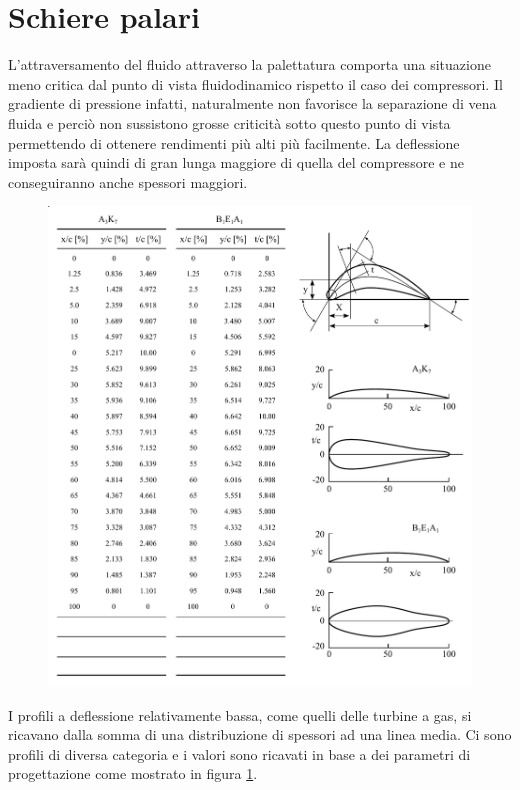 \section{Schiere palari}
L'attraversamento del fluido attraverso la palettatura comporta una situazione meno critica dal punto di vista fluidodinamico rispetto il caso dei compressori. Il gradiente di pressione infatti, naturalmente non favorisce la separazione di vena fluida e perciò non sussistono grosse criticità sotto questo punto di vista permettendo di ottenere rendimenti più alti più facilmente. La deflessione imposta sarà quindi di gran lunga maggiore di quella del compressore e ne conseguiranno anche spessori maggiori. 
\begin{figure}
\centering
  \includegraphics[width=\textwidth]{fig/SchierePaleTab.pdf}
\caption{}
\label{fig:SchierePaleTab}
\end{figure}

I profili a deflessione relativamente bassa, come quelli delle turbine a gas, si ricavano dalla somma di una distribuzione di spessori ad una linea media. Ci sono profili di diversa categoria e i valori sono ricavati in base a dei parametri di progettazione come mostrato in figura \ref{fig:SchierePaleTab}.

